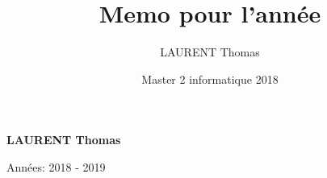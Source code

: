 \documentclass[french, 12pt]{report}
\title{Memo pour l'année}
\author{LAURENT Thomas}
\date{Master 2 informatique 2018}
\begin{document}
\begin{titlepage}
\begin{center}
       \vspace*{1cm}
 
 
       \vspace{0.5cm}
       \scalebox{2}{Master 2 IA}
 
       \vspace{1.5cm}
 
       \textbf{LAURENT Thomas}
 
       \vfill
 
       \vspace{0.8cm}
 
       Années: 2018 - 2019
 
   \end{center}
\end{titlepage}
\pagebreak
\pagebreak
\pagebreak
\tableofcontents






%




\pagebreak
\end{document}

